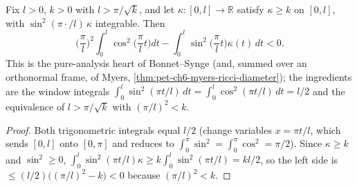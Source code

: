 \begin{lemma}
  \label{lem:pet-ch6-bonnet-synge-index-core}
  \leanok
  Fix $l>0$, $k>0$ with $l>\pi/\sqrt k$, and let $\kappa:[0,l]\to\mathbb R$ satisfy
  $\kappa\ge k$ on $[0,l]$, with $\sin^2(\pi\cdot/l)\,\kappa$ integrable. Then
  \[
    \Big(\frac\pi l\Big)^2\int_0^l\cos^2\Big(\frac\pi lt\Big)dt
      -\int_0^l\sin^2\Big(\frac\pi lt\Big)\kappa(t)\,dt<0 .
  \]
  This is the pure-analysis heart of Bonnet--Synge (and, summed over an orthonormal frame,
  of Myers, \cref{thm:pet-ch6-myers-ricci-diameter}); the ingredients are the window
  integrals $\int_0^l\sin^2(\pi t/l)\,dt=\int_0^l\cos^2(\pi t/l)\,dt=l/2$ and the equivalence
  of $l>\pi/\sqrt k$ with $(\pi/l)^2<k$.
\end{lemma}
\begin{proof}
  \leanok
  Both trigonometric integrals equal $l/2$ (change variables $x=\pi t/l$, which sends
  $[0,l]$ onto $[0,\pi]$ and reduces to $\int_0^\pi\sin^2=\int_0^\pi\cos^2=\pi/2$). Since
  $\kappa\ge k$ and $\sin^2\ge0$, $\int_0^l\sin^2(\pi t/l)\kappa\ge k\int_0^l\sin^2(\pi t/l)
  =kl/2$, so the left side is $\le(l/2)\big((\pi/l)^2-k\big)<0$ because $(\pi/l)^2<k$.
\end{proof}

